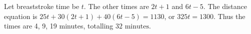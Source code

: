 Let breaststroke time be $t$. The other times are $2t+1$ and $6t-5$. The distance equation is $25t+30(2t+1)+40(6t-5)=1130$, or $325t=1300$. Thus the times are 4, 9, 19 minutes, totalling $\boxed{32\text{ minutes}}$.

